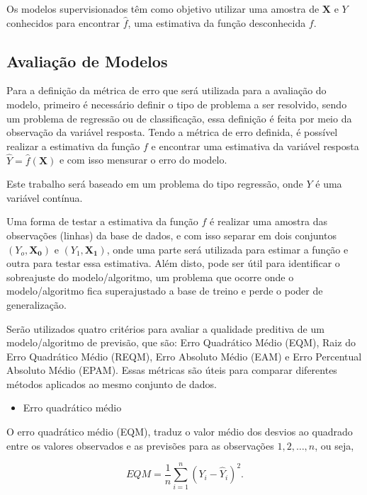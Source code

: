\documentclass[
	12pt,				%
	a4paper,		%
	oneside,    %
	chapter=TITLE,		   %
	section=TITLE,		   %
	subsection=TITLE,	   %
	subsubsection=TITLE, %
	english,			%
	french,				%
	spanish,			%
	brazil,				%
]{abntex2}
\providecommand{\tightlist}{%
	\setlength{\itemsep}{0pt}\setlength{\parskip}{0pt}}
\begin{document}
Os modelos supervisionados têm como objetivo utilizar uma amostra de
\(\boldsymbol{X}\) e \(Y\) conhecidos para encontrar \(\hat{f}\), uma
estimativa da função desconhecida \(f\).

\hypertarget{avaliauxe7uxe3o-de-modelos}{%
\subsection{Avaliação de Modelos}\label{avaliauxe7uxe3o-de-modelos}}

Para a definição da métrica de erro que será utilizada para a avaliação
do modelo, primeiro é necessário definir o tipo de problema a ser
resolvido, sendo um problema de regressão ou de classificação, essa
definição é feita por meio da observação da variável resposta. Tendo a
métrica de erro definida, é possível realizar a estimativa da função
\(f\) e encontrar uma estimativa da variável resposta
\(\hat{Y} = \hat{f}(\boldsymbol{X})\) e com isso mensurar o erro do
modelo.

Este trabalho será baseado em um problema do tipo regressão, onde \(Y\)
é uma variável contínua.

Uma forma de testar a estimativa da função \(f\) é realizar uma amostra
das observações (linhas) da base de dados, e com isso separar em dois
conjuntos \((Y_o, \boldsymbol{X_0})\) e \((Y_1, \boldsymbol{X_1})\),
onde uma parte será utilizada para estimar a função e outra para testar
essa estimativa. Além disto, pode ser útil para identificar o
sobreajuste do modelo/algoritmo, um problema que ocorre onde o
modelo/algoritmo fica superajustado a base de treino e perde o poder de
generalização.

Serão utilizados quatro critérios para avaliar a qualidade preditiva de
um modelo/algoritmo de previsão, que são: Erro Quadrático Médio (EQM),
Raiz do Erro Quadrático Médio (REQM), Erro Absoluto Médio (EAM) e Erro
Percentual Absoluto Médio (EPAM). Essas métricas são úteis para comparar
diferentes métodos aplicados ao mesmo conjunto de dados.

\begin{itemize}
\tightlist
\item
  Erro quadrático médio
\end{itemize}

O erro quadrático médio (EQM), traduz o valor médio dos desvios ao
quadrado entre os valores observados e as previsões para as observações
\(1, 2,\dots,n\), ou seja,

\[EQM = \frac{1}{n}\sum_{i=1}^n(Y_i - \hat{Y}_i)^2.\]
\end{document}
